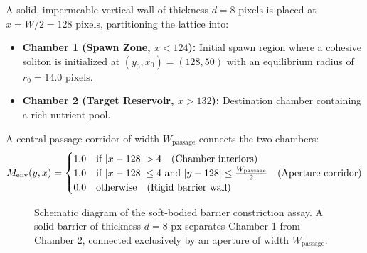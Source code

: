 A solid, impermeable vertical wall of thickness $d = 8\text{ pixels}$ is placed at $x = W/2 = 128\text{ pixels}$, partitioning the lattice into:
\begin{itemize}
    \item \textbf{Chamber 1 (Spawn Zone, $x < 124$):} Initial spawn region where a cohesive soliton is initialized at $(y_0, x_0) = (128, 50)$ with an equilibrium radius of $r_0 = 14.0\text{ pixels}$.
    \item \textbf{Chamber 2 (Target Reservoir, $x > 132$):} Destination chamber containing a rich nutrient pool.
\end{itemize}

A central passage corridor of width $W_{\text{passage}}$ connects the two chambers:
\begin{equation}
M_{\text{env}}(y, x) = 
\begin{cases}
1.0 & \text{if } |x - 128| > 4 \quad (\text{Chamber interiors}) \\
1.0 & \text{if } |x - 128| \le 4 \text{ and } |y - 128| \le \frac{W_{\text{passage}}}{2} \quad (\text{Aperture corridor}) \\
0.0 & \text{otherwise} \quad (\text{Rigid barrier wall})
\end{cases}
\label{eq:barrier_mask_definition}
\end{equation}

\begin{figure}[htbp]
\centering
{}
\caption{Schematic diagram of the soft-bodied barrier constriction assay. A solid barrier of thickness $d = 8\text{ px}$ separates Chamber 1 from Chamber 2, connected exclusively by an aperture of width $W_{\text{passage}}$.}
\label{fig:diagram_barrier_constriction_setup}
\end{figure}

